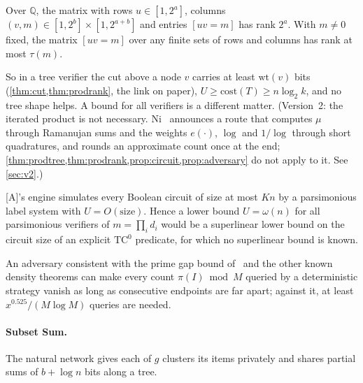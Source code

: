 \documentclass[10pt]{amsart}
\theoremstyle{plain}
\theoremstyle{definition}
\theoremstyle{remark}
\numberwithin{equation}{section}
\newcommand{\A}{\textup{[A]}}
\newcommand{\Q}{\mathbb{Q}}
\begin{document}
\begin{theorem}\label{thm:prodrank}
Over $\Q$, the matrix with rows $u\in[1,2^a]$, columns $(v,m)\in[1,2^b]\times[1,2^{a+b}]$ and entries
$[uv=m]$ has rank $2^a$. With $m\ne0$ fixed, the matrix $[uv=m]$ over any finite sets of rows and
columns has rank at most $\tau(m)$.
\end{theorem}

\noindent So in a tree verifier the cut above a node $v$ carries at least $\mathrm{wt}(v)$ bits
(\cref{thm:cut,thm:prodrank}, the link on paper), $U\ge\mathrm{cost}(T)\ge n\log_2k$, and no tree shape
helps. A bound for all verifiers is a different matter. (Version~2: the iterated product is not
necessary. Ni~\cite{Ni26} announces a route that computes $\mu$ through Ramanujan sums and the
weights $e(\cdot)$, $\log$ and $1/\log$ through short quadratures, and rounds an approximate count
once at the end; \cref{thm:prodtree,thm:prodrank,prop:circuit,prop:adversary} do not apply to it.
See \cref{sec:v2}.)

\begin{proposition}\label{prop:circuit}
\A's engine simulates every Boolean circuit of size at most $Kn$ by a parsimonious label system with
$U=O(\text{size})$. Hence a lower bound $U=\omega(n)$ for all parsimonious verifiers of $m=\prod_id_i$
would be a superlinear lower bound on the circuit size of an explicit $\mathrm{TC}^0$ predicate, for
which no superlinear bound is known.
\end{proposition}

\begin{proposition}\label{prop:adversary}
An adversary consistent with the prime gap bound of~\cite{BHP01} and the other known density theorems
can make every count $\pi(I)\bmod M$ queried by a deterministic strategy vanish as long as consecutive
endpoints are far apart; against it, at least $x^{0.525}/(M\log M)$ queries are needed.
\end{proposition}

\paragraph{Subset Sum.} The natural network gives each of $g$ clusters its items privately and shares
partial sums of $b+\log n$ bits along a tree.
\end{document}
